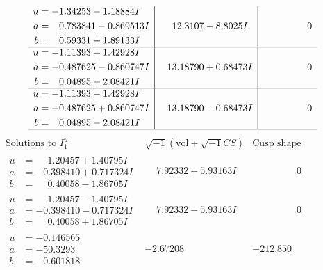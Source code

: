 \documentclass[1p]{elsarticle_modified}
\theoremstyle{definition}
\newcommand{\I}{\sqrt{-1}}
\begin{document}
$$\begin{array}{c|c|c}
\begin{aligned}
u &= -1.34253 - 1.18884 I \\
a &= \phantom{-}0.783841 - 0.869513 I \\
b &= \phantom{-}0.59331 + 1.89133 I\end{aligned}
 & \phantom{-}12.3107 - 8.8025 I & \phantom{-0.000000 } 0 \\ \hline\begin{aligned}
u &= -1.11393 + 1.42928 I \\
a &= -0.487625 - 0.860747 I \\
b &= \phantom{-}0.04895 + 2.08421 I\end{aligned}
 & \phantom{-}13.18790 + 0.68473 I & \phantom{-0.000000 } 0 \\ \hline\begin{aligned}
u &= -1.11393 - 1.42928 I \\
a &= -0.487625 + 0.860747 I \\
b &= \phantom{-}0.04895 - 2.08421 I\end{aligned}
 & \phantom{-}13.18790 - 0.68473 I & \phantom{-0.000000 } 0\\
 \hline 
 \end{array}$$\newpage$$\begin{array}{c|c|c}  
\text{Solutions to }I^u_{1}& \I (\text{vol} + \sqrt{-1}CS) & \text{Cusp shape}\\
 \hline 
\begin{aligned}
u &= \phantom{-}1.20457 + 1.40795 I \\
a &= -0.398410 + 0.717324 I \\
b &= \phantom{-}0.40058 - 1.86705 I\end{aligned}
 & \phantom{-}7.92332 + 5.93163 I & \phantom{-0.000000 } 0 \\ \hline\begin{aligned}
u &= \phantom{-}1.20457 - 1.40795 I \\
a &= -0.398410 - 0.717324 I \\
b &= \phantom{-}0.40058 + 1.86705 I\end{aligned}
 & \phantom{-}7.92332 - 5.93163 I & \phantom{-0.000000 } 0 \\ \hline\begin{aligned}
u &= -0.146565\phantom{ +0.000000I} \\
a &= -50.3293\phantom{ +0.000000I} \\
b &= -0.601818\phantom{ +0.000000I}\end{aligned}
 & -2.67208\phantom{ +0.000000I} & -212.850\phantom{ +0.000000I} \\ \hline\begin{aligned}

\end{aligned}
\end{array}$$
\end{document}
